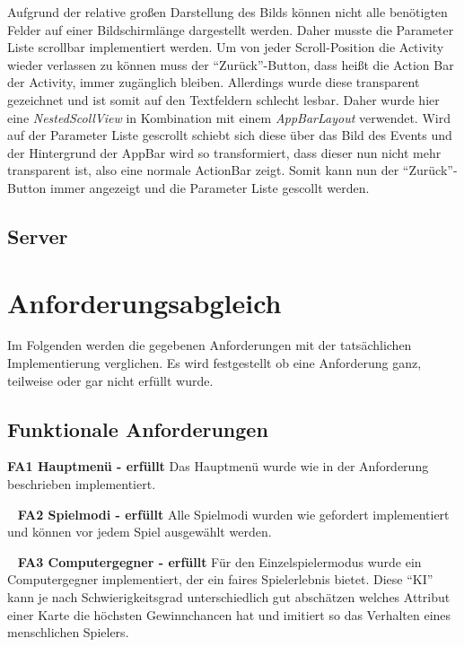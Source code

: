 \documentclass{scrartcl}
\begin{document}
Aufgrund der relative großen Darstellung des Bilds können nicht alle benötigten
Felder auf einer Bildschirmlänge dargestellt werden. Daher musste die Parameter
Liste scrollbar implementiert werden. Um von jeder Scroll-Position die Activity
wieder verlassen zu können muss der \enquote{Zurück}-Button, dass heißt die
Action Bar der Activity, immer zugänglich bleiben. Allerdings wurde diese
transparent gezeichnet und ist somit auf den Textfeldern schlecht lesbar. Daher
wurde hier eine \emph{NestedScollView} in Kombination mit einem
\emph{AppBarLayout} verwendet. Wird auf der Parameter Liste gescrollt schiebt
sich diese über das Bild des Events und der Hintergrund der AppBar wird so
transformiert, dass dieser nun nicht mehr transparent ist, also eine normale
ActionBar zeigt. Somit kann nun der \enquote{Zurück}-Button immer angezeigt und
die Parameter Liste gescollt werden.

\subsection{Server}

\section{Anforderungsabgleich}

Im Folgenden werden die gegebenen Anforderungen mit der tatsächlichen
Implementierung verglichen. Es wird festgestellt ob eine Anforderung ganz,
teilweise oder gar nicht erfüllt wurde.

\subsection{Funktionale Anforderungen}

\textbf{FA1 Hauptmenü - erfüllt} \newline
Das Hauptmenü wurde wie in der Anforderung beschrieben implementiert.

\ \newline
\textbf{FA2 Spielmodi - erfüllt} \newline
Alle Spielmodi wurden wie gefordert implementiert und können vor jedem Spiel
ausgewählt werden.

\ \newline
\textbf{FA3 Computergegner - erfüllt} \newline
Für den Einzelspielermodus wurde ein Computergegner implementiert, der ein
faires Spielerlebnis bietet. Diese \enquote{KI} kann je nach Schwierigkeitsgrad
unterschiedlich gut abschätzen welches Attribut einer Karte die höchsten
Gewinnchancen hat und imitiert so das Verhalten eines menschlichen Spielers.
\end{document}
